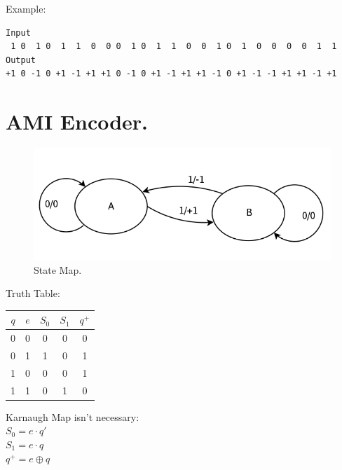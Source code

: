 \documentclass[11pt]{article}
\begin{document}
Example: 
\begin{verbatim}
Input 
 1 0  1 0  1  1  0  0 0  1 0  1  1  0  0  1 0  1  0  0  0  0  1  1
Output
+1 0 -1 0 +1 -1 +1 +1 0 -1 0 +1 -1 +1 +1 -1 0 +1 -1 -1 +1 +1 -1 +1
\end{verbatim}




\section{AMI Encoder. }

\begin{figure}[H]
\centering
\includegraphics[scale=0.35]{estados-ami_enc}
\caption[ ]{\label{estados-ami_enc} State Map.  }
\end{figure}

\begin{multicols}{2}
Truth Table: \\

\begin{tabular}{|c|c|cc|c|}
\hline
$q$ & $e$ & $S_0$ & $ S_1$ & $q^+$ \\
\hline
0 & 0 & 0 & 0 & 0 \\
0 & 1 & 1 & 0 & 1 \\
\hline
1 & 0 & 0 & 0 & 1 \\
1 & 1 & 0 & 1 & 0 \\
\hline
\end{tabular}

Karnaugh Map isn't necessary: \\
$ S_0 = e \cdot q'$ \\
$ S_1 = e \cdot q $ \\
$ q^+ = e \oplus q$ \\

\end{multicols}

\end{document}
